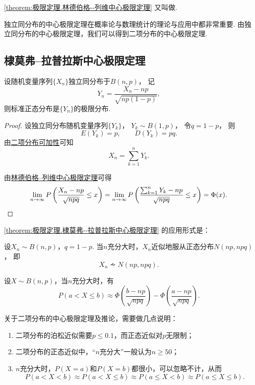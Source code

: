 \cref{theorem:极限定理.林德伯格--列维中心极限定理} 又叫做.

独立同分布的中心极限定理在概率论与数理统计的理论与应用中都非常重要.
由独立同分布的中心极限定理，我们可以得到二项分布的中心极限定理.
\subsection{棣莫弗--拉普拉斯中心极限定理}
\begin{theorem}\label{theorem:极限定理.棣莫弗--拉普拉斯中心极限定理}
设随机变量序列\(\{X_n\}\)独立同分布于\(B(n,p)\)，
记\[
	Y_n = \frac{X_n - np}{\sqrt{np(1-p)}},
\]
则标准正态分布是\(\{Y_n\}\)的极限分布.
\begin{proof}
设独立同分布随机变量序列\(\{Y_k\}\)，
\(Y_k \sim B(1,p)\)，
令\(q=1-p\)，
则\[
	E(Y_k)=p,
	\qquad
	D(Y_k)=pq.
\]
由\hyperref[theorem:多维随机变量及其分布.二项分布的可加性3]{二项分布可加性}可知\[
	X_n = \sum_{k=1}^n Y_k.
\]

由\hyperref[theorem:极限定理.林德伯格--列维中心极限定理]{林德伯格--列维中心极限定理}可得\[
	\lim_{n\to\infty} P\left(\frac{X_n-np}{\sqrt{npq}} \leq x\right)
	= \lim_{n\to\infty} P\left(\frac{\sum_{k=1}^n{Y_k}-np}{\sqrt{npq}} \leq x\right)
	= \Phi(x).
	\qedhere
\]
\end{proof}
\end{theorem}

\cref{theorem:极限定理.棣莫弗--拉普拉斯中心极限定理} 的应用形式是：
\begin{corollary}
设\(X_n \sim B(n,p)\)，\(q = 1-p\).
当\(n\)充分大时，\(X_n\)近似地服从正态分布\(N(np,npq)\)，
即\[
	X_n \dotsim N(np,npq).
\]
\end{corollary}

\begin{corollary}
设\(X \sim B(n,p)\)，当\(n\)充分大时，有\[
	P(a < X \leq b)
	\approx
	\Phi\left(\frac{b-np}{\sqrt{npq}}\right)
	- \Phi\left(\frac{a-np}{\sqrt{npq}}\right).
\]
\end{corollary}

关于二项分布的中心极限定理及推论，需要做几点说明：
\begin{enumerate}
	\item 二项分布的泊松近似需要\(p \leq 0.1\)，而正态近似对\(p\)无限制；
	\item 二项分布的正态近似中，“\(n\)充分大”一般认为\(n \geq 50\)；
	\item \(n\)充分大时，\(P(X=a)\)和\(P(X=b)\)都很小，可以忽略不计，从而\[
		P(a < X < b)
		\approx P(a < X \leq b)
		\approx P(a \leq X < b)
		\approx P(a \leq X \leq b).
	\]
\end{enumerate}

